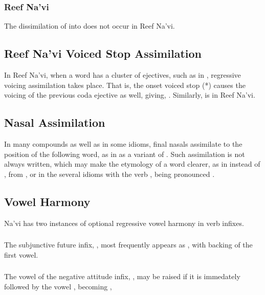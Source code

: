 \subsubsection{Reef Na'vi} 
The dissimilation of  into  does not occur in Reef
Na'vi.


\subsection{Reef Na'vi Voiced Stop Assimilation} 
In Reef Na'vi, when a word has a cluster of ejectives, such as
in  , regressive voicing assimilation takes place.
That is, the onset voiced stop (*) causes the voicing of the
previous coda ejective as well, giving, .
Similarly,   is  in Reef Na'vi.

\subsection{Nasal Assimilation} In many compounds as well as in some
idioms, final nasals assimilate to the position of the following
word, as in  as a variant of .  Such assimilation is
not always written, which may make the etymology of a word clearer, as
in  instead of , from , or in the several
idioms with the verb  ,  being pronounced
.  \label{l-and-s:nasalassim}

\subsection{Vowel Harmony} Na'vi has two instances of optional
regressive vowel harmony in verb infixes.

\subsubsection{} The subjunctive future infix, , most
frequently appears as , with backing of the first vowel.

\subsubsection{}\label{l-and-s:eng}
The vowel of the negative attitude infix, , may be raised
if it is immedately followed by the vowel , becoming ,

